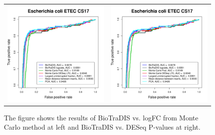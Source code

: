 \documentclass[12pt,letterpaper]{article}
\begin{document}
\begin{figure}
\centering
\begin{tabular}{c c}
\includegraphics[page=2, scale=0.5]{essential-call-comparison-CS17.pdf} &
\includegraphics[page=3, scale=0.5]{essential-call-comparison-CS17.pdf} \\
\end{tabular}
\caption{The figure shows the results of BioTraDIS vs. logFC from Monte Carlo method at left and BioTraDIS vs. DESeq P-values at right.}
\label{fig:dotplot}
\end{figure}
\end{document}
